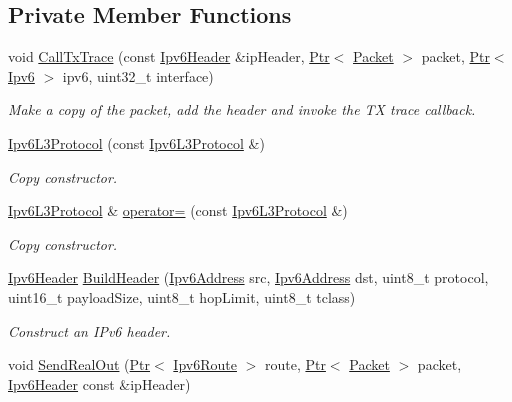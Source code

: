 \subsection*{Private Member Functions}
\begin{DoxyCompactItemize}
\item 
void \hyperlink{classns3_1_1Ipv6L3Protocol_a40e29e34a97639ad1caad6b64e732454}{Call\+Tx\+Trace} (const \hyperlink{classns3_1_1Ipv6Header}{Ipv6\+Header} \&ip\+Header, \hyperlink{classns3_1_1Ptr}{Ptr}$<$ \hyperlink{classns3_1_1Packet}{Packet} $>$ packet, \hyperlink{classns3_1_1Ptr}{Ptr}$<$ \hyperlink{classns3_1_1Ipv6}{Ipv6} $>$ ipv6, uint32\+\_\+t interface)
\begin{DoxyCompactList}\small\item\em Make a copy of the packet, add the header and invoke the TX trace callback. \end{DoxyCompactList}\item 
\hyperlink{classns3_1_1Ipv6L3Protocol_aa0f0403d05feecc7cac4745a66b0aaad}{Ipv6\+L3\+Protocol} (const \hyperlink{classns3_1_1Ipv6L3Protocol}{Ipv6\+L3\+Protocol} \&)
\begin{DoxyCompactList}\small\item\em Copy constructor. \end{DoxyCompactList}\item 
\hyperlink{classns3_1_1Ipv6L3Protocol}{Ipv6\+L3\+Protocol} \& \hyperlink{classns3_1_1Ipv6L3Protocol_a623d2b2cf5c444973830dd12cb584554}{operator=} (const \hyperlink{classns3_1_1Ipv6L3Protocol}{Ipv6\+L3\+Protocol} \&)
\begin{DoxyCompactList}\small\item\em Copy constructor. \end{DoxyCompactList}\item 
\hyperlink{classns3_1_1Ipv6Header}{Ipv6\+Header} \hyperlink{classns3_1_1Ipv6L3Protocol_a5374a6687ad09cfcd48ef13a99b48d16}{Build\+Header} (\hyperlink{classns3_1_1Ipv6Address}{Ipv6\+Address} src, \hyperlink{classns3_1_1Ipv6Address}{Ipv6\+Address} dst, uint8\+\_\+t protocol, uint16\+\_\+t payload\+Size, uint8\+\_\+t hop\+Limit, uint8\+\_\+t tclass)
\begin{DoxyCompactList}\small\item\em Construct an I\+Pv6 header. \end{DoxyCompactList}\item 
void \hyperlink{classns3_1_1Ipv6L3Protocol_adad363af4c50cd94505b918b15f228d4}{Send\+Real\+Out} (\hyperlink{classns3_1_1Ptr}{Ptr}$<$ \hyperlink{classns3_1_1Ipv6Route}{Ipv6\+Route} $>$ route, \hyperlink{classns3_1_1Ptr}{Ptr}$<$ \hyperlink{classns3_1_1Packet}{Packet} $>$ packet, \hyperlink{classns3_1_1Ipv6Header}{Ipv6\+Header} const \&ip\+Header)

\end{DoxyCompactItemize}
